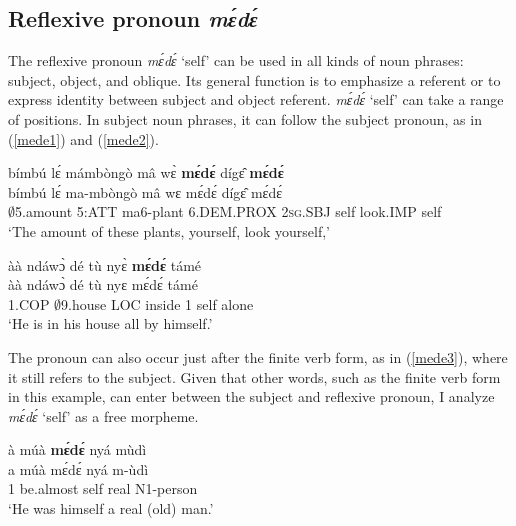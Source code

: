 \subsection{Reflexive pronoun {\itshape mɛ́dɛ́}}
\label{sec:REFL}

The reflexive pronoun {\itshape mɛ́dɛ́} `self' can be used in all kinds of noun phrases: subject, object, and oblique. Its general function is to emphasize a referent or to express identity between subject and object referent. {\itshape mɛ́dɛ́} `self' can take a range of positions. In subject noun phrases, it can follow the subject pronoun, as in (\ref{mede1}) and (\ref{mede2}). 

\begin{exe} 
\ex\label{mede1}
  \glll bímbú lɛ́ mámbòngò mâ wɛ̀ {\bfseries mɛ́dɛ́} dígɛ̂ {\bfseries mɛ́dɛ́} \\
         bímbú lɛ́ ma-mbòngò mâ wɛ mɛ́dɛ́ dígɛ̂ mɛ́dɛ́ \\
       $\emptyset$5.amount 5:ATT ma6-plant 6.DEM.PROX 2\textsc{sg}.SBJ self look.IMP self   \\
    \trans `The amount of these plants, yourself, look yourself,'
\end{exe}

\begin{exe} 
\ex\label{mede2}
  \glll   àà ndáwɔ̀ dé tù nyɛ̀ {\bfseries mɛ́dɛ́} támé   \\
           àà ndáwɔ̀ dé tù nyɛ mɛ́dɛ́ támé      \\
          1.COP $\emptyset$9.house LOC inside 1 self alone \\
    \trans `He is in his house all by himself.'
\end{exe}

The pronoun can also occur just after the finite verb form, as in (\ref{mede3}), where it still refers to the subject. Given that other words, such as the finite verb form in this example, can enter between the subject and reflexive pronoun, I analyze {\itshape mɛ́dɛ́} `self' as a free morpheme.

\begin{exe} 
\ex\label{mede3}
  \glll  à múà {\bfseries mɛ́dɛ́} nyá mùdì \\
          a múà mɛ́dɛ́ nyá m-ùdì   \\
         1 be.almost self real N1-person    \\
    \trans `He was himself a real (old) man.'
\end{exe}


